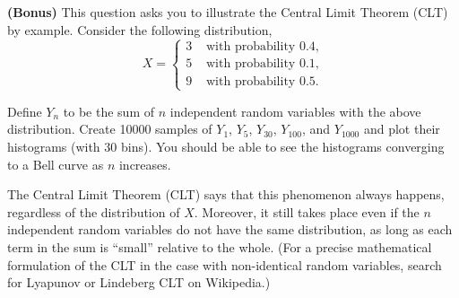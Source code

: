 \documentclass{scrreprt}
\begin{document}
    
   

    \begin{center}
    \end{center}

    
    \textbf{(Bonus)} This question asks you to illustrate the Central Limit
Theorem (CLT) by example. Consider the following distribution,
\[X = \begin{cases} 3 & \text{ with probability $0.4$,} \\ 5 & \text{ with probability $0.1$,} \\ 9 & \text{ with probability $0.5$.} \end{cases}\]

Define \(Y_n\) to be the sum of \(n\) independent random variables with
the above distribution. Create 10000 samples of \(Y_1\), \(Y_5\),
\(Y_{30}\), \(Y_{100}\), and \(Y_{1000}\) and plot their histograms
(with 30 bins). You should be able to see the histograms converging to a
Bell curve as \(n\) increases.

The Central Limit Theorem (CLT) says that this phenomenon always
happens, regardless of the distribution of \(X\). Moreover, it still
takes place even if the \(n\) independent random variables do not have
the same distribution, as long as each term in the sum is ``small''
relative to the whole. (For a precise mathematical formulation of the
CLT in the case with non-identical random variables, search for Lyapunov
or Lindeberg CLT on Wikipedia.)


    
    
    
    
\end{document}
